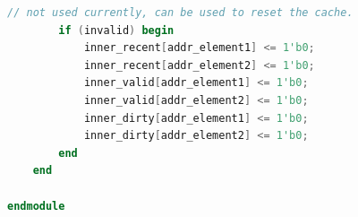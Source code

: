 \begin{lstlisting}[language = {verilog}]
        // not used currently, can be used to reset the cache.
        if (invalid) begin
            inner_recent[addr_element1] <= 1'b0;
            inner_recent[addr_element2] <= 1'b0;
            inner_valid[addr_element1] <= 1'b0;
            inner_valid[addr_element2] <= 1'b0;
            inner_dirty[addr_element1] <= 1'b0;
            inner_dirty[addr_element2] <= 1'b0;
        end
    end

endmodule    
\end{lstlisting}